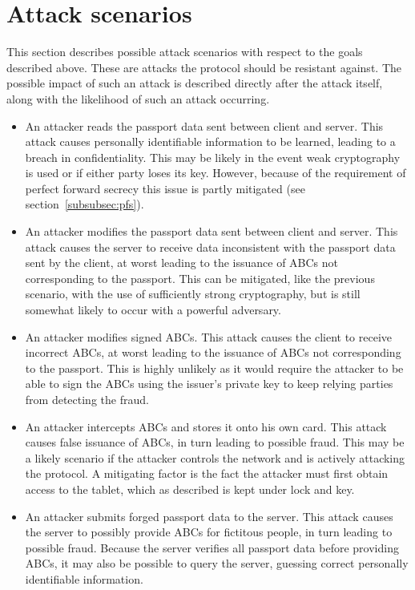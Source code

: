 \section{Attack scenarios}
This section describes possible attack scenarios with respect to the goals described above. These are attacks the protocol should be resistant against. The possible impact of such an attack is described directly after the attack itself, along with the likelihood of such an attack occurring.

\begin{itemize}
	\item An attacker reads the passport data sent between client and server. This attack causes personally identifiable information to be learned, leading to a breach in confidentiality. This may be likely in the event weak cryptography is used or if either party loses its key. However, because of the requirement of perfect forward secrecy this issue is partly mitigated (see section~\ref{subsubsec:pfs}).
  \item An attacker modifies the passport data sent between client and server. This attack causes the server to receive data inconsistent with the passport data sent by the client, at worst leading to the issuance of ABCs not corresponding to the passport. This can be mitigated, like the previous scenario, with the use of sufficiently strong cryptography, but is still somewhat likely to occur with a powerful adversary.
  \item An attacker modifies signed ABCs. This attack causes the client to receive incorrect ABCs, at worst leading to the issuance of ABCs not corresponding to the passport. This is highly unlikely as it would require the attacker to be able to sign the ABCs using the issuer's private key to keep relying parties from detecting the fraud.
  \item An attacker intercepts ABCs and stores it onto his own card. This attack causes false issuance of ABCs, in turn leading to possible fraud. This may be a likely scenario if the attacker controls the network and is actively attacking the protocol. A mitigating factor is the fact the attacker must first obtain access to the tablet, which as described is kept under lock and key.
  \item An attacker submits forged passport data to the server. This attack causes the server to possibly provide ABCs for fictitous people, in turn leading to possible fraud. Because the server verifies all passport data before providing ABCs, it may also be possible to query the server, guessing correct personally identifiable information.

\end{itemize}
